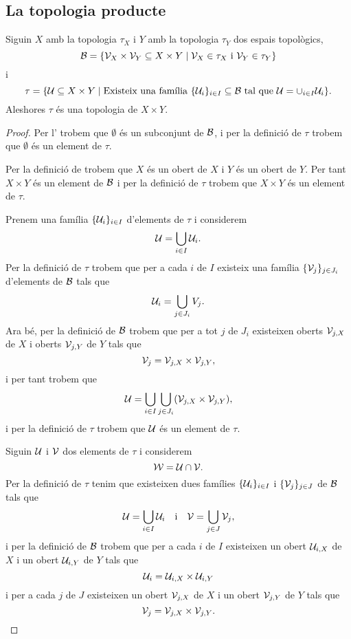 \documentclass[../Apunts.tex]{subfiles}
\begin{document}
	\subsection{La topologia producte}
	\begin{proposition}
		\label{prop:la topologia producte}
		Siguin \(X\) amb la topologia \(\tau_{X}\) i \(Y\) amb la topologia \(\tau_{Y}\) dos espais topològics,
		\[\mathcal{B}=\{\mathcal{V}_{X}\times\mathcal{V}_{Y}\subseteq X\times Y\mid\mathcal{V}_{X}\in\tau_{X}\text{ i }\mathcal{V}_{Y}\in\tau_{Y}\}\]
		i
		\[\tau=\{\mathcal{U}\subseteq X\times Y\mid\text{Existeix una família }\{\mathcal{U}_{i}\}_{i\in I}\subseteq\mathcal{B}\text{ tal que }\mathcal{U}=\cup_{i\in I}\mathcal{U}_{i}\}.\]
		Aleshores \(\tau\) és una topologia de \(X\times Y\).
		\begin{proof}
			Per l' trobem que \(\emptyset\) és un subconjunt de \(\mathcal{B}\), i per la definició de \(\tau\) trobem que \(\emptyset\) és un element de \(\tau\).
			
			Per la definició de  trobem que \(X\) és un obert de \(X\) i \(Y\) és un obert de \(Y\). Per tant \(X\times Y\) és un element de \(\mathcal{B}\) i per la definició de \(\tau\) trobem que \(X\times Y\) és un element de \(\tau\).
			
			Prenem una família \(\{\mathcal{U}_{i}\}_{i\in I}\) d'elements de \(\tau\) i considerem
			\[\mathcal{U}=\bigcup_{i\in I}\mathcal{U}_{i}.\]
			Per la definició de \(\tau\) trobem que per a cada \(i\) de \(I\) existeix una família \(\{\mathcal{V}_{j}\}_{j\in J_{i}}\) d'elements de \(\mathcal{B}\) tals que
			\[\mathcal{U}_{i}=\bigcup_{j\in J_{i}}V_{j}.\]
			Ara bé, per la definició de \(\mathcal{B}\) trobem que per a tot \(j\) de \(J_{i}\) existeixen oberts \(\mathcal{V}_{j,X}\) de \(X\) i oberts \(\mathcal{V}_{j,Y}\) de \(Y\) tals que
			\[\mathcal{V}_{j}=\mathcal{V}_{j,X}\times\mathcal{V}_{j,Y},\]
			i per tant trobem que
			\[\obert{U}=\bigcup_{i\in I}\bigcup_{j\in J_{i}}\left(\obert{V}_{j,X}\times\obert{V}_{j,Y}\right),\]
			i per la definició de \(\tau\) trobem que \(\mathcal{U}\) és un element de \(\tau\).
			
			Siguin \(\mathcal{U}\) i \(\mathcal{V}\) dos elements de \(\tau\) i considerem
			\[\mathcal{W}=\mathcal{U}\cap\mathcal{V}.\]
			Per la definició de \(\tau\) tenim que existeixen dues famílies \(\{\mathcal{U}_{i}\}_{i\in I}\) i \(\{\mathcal{V}_{j}\}_{j\in J}\) de \(\mathcal{B}\) tals que
			\[\mathcal{U}=\bigcup_{i\in I}\mathcal{U}_{i}\quad\text{i}\quad\mathcal{V}=\bigcup_{j\in J}\mathcal{V}_{j},\]
			i per la definició de \(\mathcal{B}\) trobem que per a cada \(i\) de \(I\) existeixen un obert \(\mathcal{U}_{i,X}\) de \(X\) i un obert \(\mathcal{U}_{i,Y}\) de \(Y\) tals que
			\[\mathcal{U}_{i}=\mathcal{U}_{i,X}\times\mathcal{U}_{i,Y}\]
			i per a cada \(j\) de \(J\) existeixen un obert \(\mathcal{V}_{j,X}\) de \(X\) i un obert \(\mathcal{V}_{j,Y}\) de \(Y\) tals que
			\[\mathcal{V}_{j}=\mathcal{V}_{j,X}\times\mathcal{V}_{j,Y}.\]
			

\end{proof}
\end{proposition}
\end{document}
